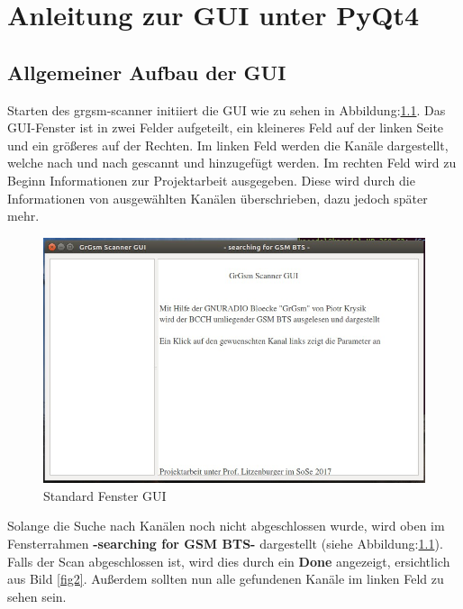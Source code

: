 \chapter{Anleitung zur GUI unter PyQt4}

\section{Allgemeiner Aufbau der GUI}

Starten des grgsm-scanner initiiert die GUI wie zu sehen in Abbildung:\ref{fig1}.
Das GUI-Fenster ist in zwei Felder aufgeteilt, ein kleineres Feld auf der linken Seite
und ein größeres auf der Rechten.
Im linken Feld werden die Kanäle dargestellt, welche nach und nach gescannt und hinzugefügt werden.
Im rechten Feld wird zu Beginn Informationen zur Projektarbeit ausgegeben. Diese wird durch die Informationen von ausgewählten Kanälen überschrieben, dazu jedoch später mehr.

\begin{figure}[H]
\centering
\includegraphics[scale=0.5]{GUI_Window}
\caption{Standard Fenster GUI}
\label{fig1}
\end{figure}

\noindent Solange die Suche nach Kanälen noch nicht abgeschlossen wurde, wird oben im Fensterrahmen \textbf{-searching for GSM BTS-} dargestellt (siehe Abbildung:\ref{fig1}).
Falls der Scan abgeschlossen ist, wird dies durch ein \textbf{Done} angezeigt, ersichtlich aus Bild \ref{fig2}. Außerdem sollten nun alle gefundenen Kanäle im linken Feld zu sehen sein.

